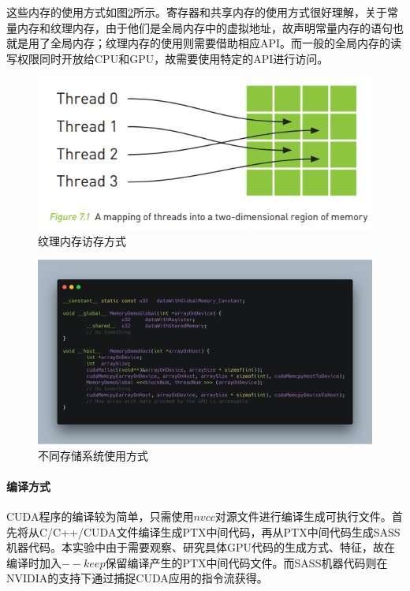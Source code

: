 \par 这些内存的使用方式如图\ref{Fig.3}所示。寄存器和共享内存的使用方式很好理解，关于常量内存和纹理内存，由于他们是全局内存中的虚拟地址，故声明常量内存的语句也就是用了全局内存；纹理内存的使用则需要借助相应API。而一般的全局内存的读写权限同时开放给CPU和GPU，故需要使用特定的API进行访问。
\begin{figure}
	\centering
	\includegraphics[width=15cm]{figures/Fig1.jpg}
	\caption{\label{Fig.1} 纹理内存访存方式}
\end{figure}
\begin{figure}
	\centering
	\includegraphics[width=15cm]{figures/CODE2.png}
	\caption{\label{Fig.3} 不同存储系统使用方式}
\end{figure}
\paragraph{编译方式}
\par CUDA程序的编译较为简单，只需使用$ nvcc $对源文件进行编译生成可执行文件。首先将从C/C++/CUDA文件编译生成PTX中间代码，再从PTX中间代码生成SASS机器代码。本实验中由于需要观察、研究具体GPU代码的生成方式、特征，故在编译时加入$ --keep $保留编译产生的PTX中间代码文件。而SASS机器代码则在NVIDIA的支持下通过捕捉CUDA应用的指令流获得。
